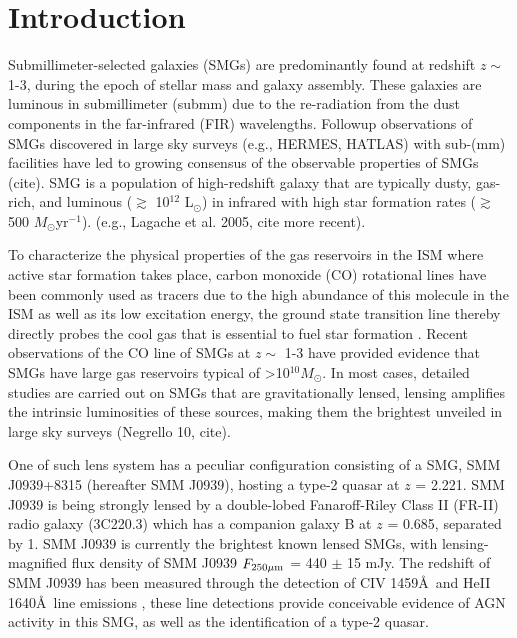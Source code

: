 \documentclass[twocolumn,apj,numberedappendix]{emulateapj}
\newcommand{\Msun}{\mbox{$M_{\odot}$}}
\newcommand{\Lsun}{\mbox{L$_{\odot}$}}
\newcommand{\pmOne}{$^{-1}$}
\begin{document}
\section{Introduction}\label{sec:intro}
Submillimeter-selected galaxies (SMGs) are predominantly found at redshift $z \sim$ 1-3, during the epoch of stellar mass and 
galaxy assembly. These galaxies are luminous in submillimeter (submm) due to the re-radiation from the dust components in the
 far-infrared (FIR) wavelengths. Followup observations of SMGs discovered in large sky surveys (e.g., HERMES, HATLAS) with sub-(mm) facilities have led to growing consensus
  of the observable properties of SMGs (cite). SMG is a population of high-redshift galaxy that are typically dusty, gas-rich, 
  and luminous ($\gtrsim$ 10$^{12}$ \Lsun) in infrared with high star formation rates ($\gtrsim $ 500 \Msun yr\pmOne). (e.g., Lagache et al. 2005, cite more recent). \par
  To characterize the physical properties of the gas reservoirs in the ISM where active star formation takes place, carbon monoxide (CO) rotational lines have been commonly used as tracers due to the high abundance of this molecule in the ISM as well as its low excitation energy, the ground state transition line thereby directly probes the cool gas that is essential to fuel star formation \citep{Carilli13a}. Recent observations of the CO line of SMGs at $z \sim$ 1-3 have  
provided evidence that SMGs have large gas reservoirs typical of \textgreater 10$^{10}$\Msun. In most cases, detailed studies are carried out on SMGs that are gravitationally lensed, lensing amplifies the intrinsic luminosities of these sources, making them the brightest unveiled in large sky surveys (Negrello 10, cite). \par
One of such lens system has a peculiar configuration consisting of a SMG, SMM J0939+8315 (hereafter SMM J0939), hosting a 
type-2 quasar at $z$ = 2.221. SMM J0939 is being strongly lensed by a double-lobed Fanaroff-Riley Class II (FR-II) \citep*{Fanaroff74} radio galaxy (3C220.3) which has a 
companion galaxy B at $z$ = 0.685, separated by 1. SMM J0939 is currently
the brightest known lensed
SMGs, with lensing-magnified flux density of SMM J0939 $F_{\rm 250\mu m}$ = 440 $\pm$ 15 mJy. The redshift of SMM J0939 has 
been measured through the detection of CIV 1459\AA\
 and HeII 1640\AA\
line emissions \citep[hereafter H14]{Haas14}, these line detections provide conceivable evidence of AGN activity in this SMG, as well as the identification of a type-2 quasar. 
\end{document}
